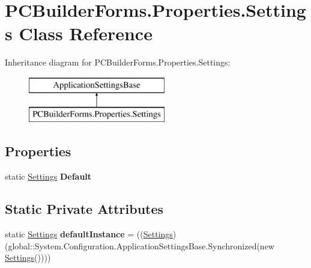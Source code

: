 \hypertarget{class_p_c_builder_forms_1_1_properties_1_1_settings}{}\section{P\+C\+Builder\+Forms.\+Properties.\+Settings Class Reference}
\label{class_p_c_builder_forms_1_1_properties_1_1_settings}
Inheritance diagram for P\+C\+Builder\+Forms.\+Properties.\+Settings\+:\begin{figure}[H]
\begin{center}
\leavevmode
\includegraphics[height=2.000000cm]{class_p_c_builder_forms_1_1_properties_1_1_settings}
\end{center}
\end{figure}
\subsection*{Properties}
\begin{DoxyCompactItemize}
\item 
static \hyperlink{class_p_c_builder_forms_1_1_properties_1_1_settings}{Settings} {\bfseries Default}\hypertarget{class_p_c_builder_forms_1_1_properties_1_1_settings_ab249d99921408a81b2f5b75c0945e547}{}\label{class_p_c_builder_forms_1_1_properties_1_1_settings_ab249d99921408a81b2f5b75c0945e547}

\end{DoxyCompactItemize}
\subsection*{Static Private Attributes}
\begin{DoxyCompactItemize}
\item 
static \hyperlink{class_p_c_builder_forms_1_1_properties_1_1_settings}{Settings} {\bfseries default\+Instance} = ((\hyperlink{class_p_c_builder_forms_1_1_properties_1_1_settings}{Settings})(global\+::\+System.\+Configuration.\+Application\+Settings\+Base.\+Synchronized(new \hyperlink{class_p_c_builder_forms_1_1_properties_1_1_settings}{Settings}())))\hypertarget{class_p_c_builder_forms_1_1_properties_1_1_settings_a05f0262a3e60a5088e4bfe2040b999c0}{}\label{class_p_c_builder_forms_1_1_properties_1_1_settings_a05f0262a3e60a5088e4bfe2040b999c0}

\end{DoxyCompactItemize}


